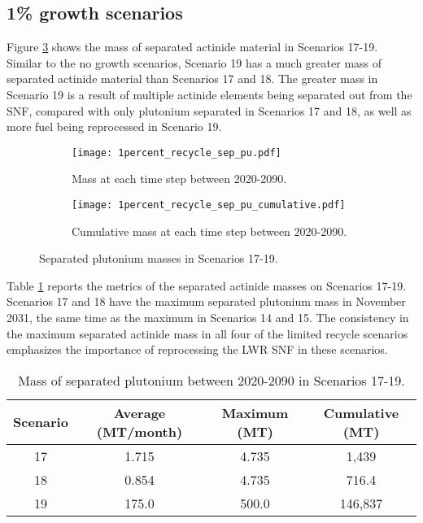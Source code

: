 \subsection{1\% growth scenarios}
Figure \ref{fig:1percent_recycle_sep_pu} shows the mass of separated 
actinide material in Scenarios 17-19. Similar to the no growth 
scenarios, Scenario 19 has a much greater mass of separated 
actinide material than Scenarios 17 and 18. The greater mass in 
Scenario 19 is a result of multiple actinide elements being 
separated out from the \gls{SNF}, compared with only 
plutonium separated in Scenarios 17 and 18, as well as more fuel 
being reprocessed in Scenario 19. 

\begin{figure}[h!]
    \centering
    \begin{subfigure}[b]{0.49\textwidth}
        \centering
        \texttt{[image: 1percent\_recycle\_sep\_pu.pdf]}
        \caption{Mass 
        at each time step between 2020-2090.}
        \label{fig:1percent_recycle_sep_pu_all}
    \end{subfigure}
    \hfill
    \begin{subfigure}[b]{0.49\textwidth}
        \centering
        \texttt{[image: 1percent\_recycle\_sep\_pu\_cumulative.pdf]}
        \caption{Cumulative mass 
        at each time step between 2020-2090.}
        \label{fig:1percent_recycle_sep_pu_cumulative}
    \end{subfigure}
       \caption{Separated plutonium masses in Scenarios 17-19.}
       \label{fig:1percent_recycle_sep_pu}
\end{figure}

Table \ref{tab:s17-19_sep_pu} reports the metrics of the separated 
actinide masses on Scenarios 17-19. Scenarios 17 and 18 have the 
maximum separated plutonium mass in November 2031, the same time 
as the maximum in Scenarios 14 and 15. The consistency in the 
maximum separated actinide mass in all four of the limited 
recycle scenarios emphasizes the importance of reprocessing the 
\gls{LWR} \gls{SNF} in these scenarios. 

\begin{table}[h!]
    \centering 
    \caption{Mass of separated plutonium between 2020-2090 in Scenarios 
    17-19.}
    \label{tab:s17-19_sep_pu}
    \begin{tabular}{c c c c}
        \hline 
        Scenario & Average (MT/month) & Maximum (MT) & Cumulative (MT) \\
        \hline
        17 & 1.715 & 4.735 & 1,439\\
        18 & 0.854 & 4.735 & 716.4\\
        19 & 175.0 & 500.0 & 146,837\\
        \hline
    \end{tabular}
\end{table}

